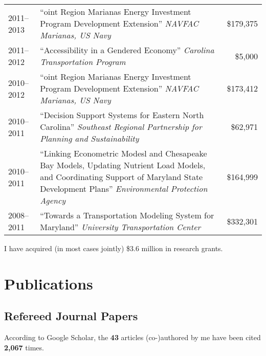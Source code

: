 \documentclass[11pt,a4paper,]{awesome-cv}
\begin{document}
\begin{longtable}{lp{11.3cm}r}
  2011--2013 & ``oint Region Marianas Energy Investment Program Development Extension'' \emph{NAVFAC Marianas, US Navy} & \$179,375 \\ 
  2011--2012 & ``Accessibility in a Gendered Economy''  \emph{Carolina Transportation Program} & \$5,000 \\ 
  2010--2012 & ``oint Region Marianas Energy Investment Program Development Extension'' \emph{NAVFAC Marianas, US Navy} & \$173,412 \\ 
  2010--2011 & ``Decision Support Systems for Eastern North Carolina''  \emph{Southeast Regional Partnership for Planning and Sustainability} & \$62,971 \\ 
  2010--2011 & ``Linking Econometric Modesl and Chesapeake Bay Models, Updating Nutrient Load Models, and Coordinating Support of Maryland State Development Plans''    \emph{Environmental Protection Agency} & \$164,999 \\ 
  2008--2011 & ``Towards a Transportation Modeling  System for Maryland''   \emph{University Transportation Center} & \$332,301 \\ 
  \hline
\end{longtable}

I have acquired (in most cases jointly) \$3.6 million in research
grants.

\section{Publications}\label{publications}

\subsection{Refereed Journal Papers}\label{refereed-journal-papers}

According to Google Scholar, the \textbf{43} articles (co-)authored by
me have been cited \textbf{2,067} times.
\end{document}
